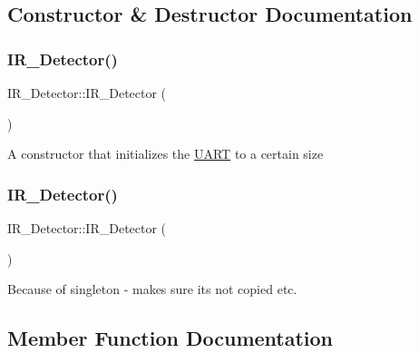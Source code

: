 \subsection{Constructor \& Destructor Documentation}
\hypertarget{class_i_r___detector_a6c051938cb1521fff4038e81957967e5}{}\label{class_i_r___detector_a6c051938cb1521fff4038e81957967e5} 
\subsubsection{\texorpdfstring{I\+R\+\_\+\+Detector()}{IR\_Detector()}\hspace{0.1cm}{\footnotesize\ttfamily [1/2]}}
{\footnotesize\ttfamily I\+R\+\_\+\+Detector\+::\+I\+R\+\_\+\+Detector (\begin{DoxyParamCaption}{ }\end{DoxyParamCaption})\hspace{0.3cm}{\ttfamily [private]}}

A constructor that initializes the \hyperlink{class_u_a_r_t}{U\+A\+RT} to a certain size \hypertarget{class_i_r___detector_aee7ffc5bae132f38a647a91fc2803b96}{}\label{class_i_r___detector_aee7ffc5bae132f38a647a91fc2803b96} 
\subsubsection{\texorpdfstring{I\+R\+\_\+\+Detector()}{IR\_Detector()}\hspace{0.1cm}{\footnotesize\ttfamily [2/2]}}
{\footnotesize\ttfamily I\+R\+\_\+\+Detector\+::\+I\+R\+\_\+\+Detector (\begin{DoxyParamCaption}\item[{const \hyperlink{class_i_r___detector}{I\+R\+\_\+\+Detector} \&}]{ }\end{DoxyParamCaption})\hspace{0.3cm}{\ttfamily [delete]}}

Because of singleton -\/ makes sure its not copied etc. 

\subsection{Member Function Documentation}
\hypertarget{class_i_r___detector_a5d7d49b666f9ec72f997c804774e4013}{}\label{class_i_r___detector_a5d7d49b666f9ec72f997c804774e4013} 
